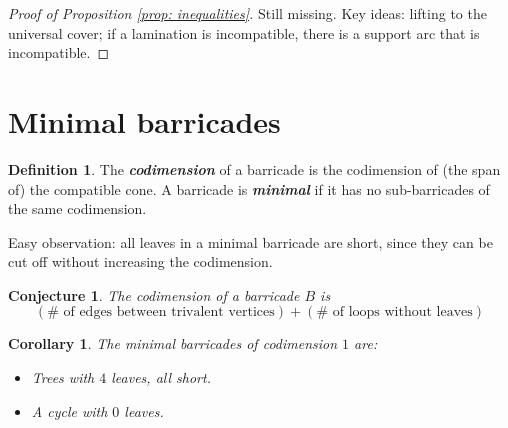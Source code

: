 \documentclass{amsart}
\newtheorem{corollary}[proposition]{Corollary}
\newtheorem{prop}[proposition]{Proposition}
\newtheorem{conj}[proposition]{Conjecture}
\theoremstyle{definition}
\newtheorem{definition}[proposition]{Definition}
\theoremstyle{remark}
\numberwithin{equation}{section}
\newcommand{\newword}[1]{\textbf{\emph{#1}}}
\newcommand{\0}{{\mathbf{0}}}
\begin{document}
\begin{proof}[Proof of Proposition \ref{prop: inequalities}]
Still missing. Key ideas: lifting to the universal cover; if a lamination is incompatible, there is a support arc that is incompatible.
%
%
\end{proof}

\section{Minimal barricades}


\begin{definition}
The \newword{codimension} of a barricade is the codimension of (the span of) the compatible cone. A barricade is \newword{minimal} if it has no sub-barricades of the same codimension.
\end{definition}

Easy observation: all leaves in a minimal barricade are short, since they can be cut off without increasing the codimension.




\begin{conj}
The codimension of a barricade $B$ is 
\[ (\text{$\#$ of edges between trivalent vertices}) + (\text{$\#$ of loops without leaves}) \]
\end{conj}

\begin{corollary}
The minimal barricades of codimension $1$ are:
\begin{itemize}
	\item Trees with $4$ leaves, all short.
	\item A cycle with $0$ leaves.
\end{itemize}
\end{corollary}
\end{document}
